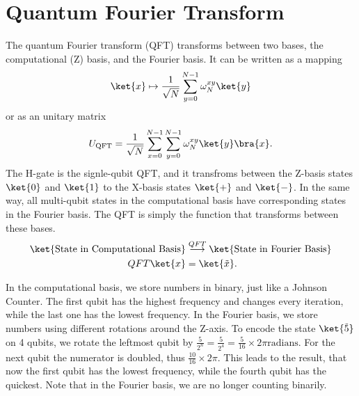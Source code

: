 \section{Quantum Fourier Transform}
The quantum Fourier transform (QFT) transforms between two bases, the
computational (Z) basis, and the Fourier basis. It can be written as a
mapping
\begin{equation}
  \label{eq:2}
  \ket{x} \mapsto \frac{1}{\sqrt{N}}\sum^{N-1}_{y=0}\omega^{xy}_{N}\ket{y}
\end{equation}
or as an unitary matrix
\begin{equation}
  \label{eq:3}
  U_{\text{QFT}}= \frac{1}{\sqrt{N}}\sum^{N-1}_{x=0}\sum^{N-1}_{y=0}\omega^{xy}_N\ket{y}\bra{x}.
\end{equation}
The H-gate is the
signle-qubit QFT, and it transfroms between the Z-basis states
$\ket{0}$ and $\ket{1}$ to the X-basis states $\ket{+}$ and
$\ket{-}$. In the same way, all multi-qubit states in the
computational basis have corresponding states in the Fourier
basis. The QFT is simply the function that transforms between these
bases.
\begin{align}
  \label{eq:1}
  \ket{\text{State in Computational Basis}}
  &\overset{QFT}{\longrightarrow} \ket{\text{State in Fourier
    Basis}}\\
  QFT\ket{x} &= \ket{\tilde{x}}.\\
\end{align}

In the computational basis, we store numbers in binary, just like a
Johnson Counter.
The first qubit has the highest frequency and changes every iteration,
while the last one has the lowest frequency.
In the Fourier basis, we store numbers using different rotations
around the Z-axis.
To encode the state $\ket{\tilde{5}}$ on 4 qubits, we rotate the
leftmost qubit by $\frac{5}{2^n} = \frac{5}{2^4} = \frac{5}{16}\times
2\pi \text{radians}$. For the next qubit the numerator is doubled,
thus $\frac{10}{16} \times 2\pi$.
This leads to the result, that now the first qubit has the lowest
frequency, while the fourth qubit has the quickest. Note that in the
Fourier basis, we are no longer counting binarily.
\begin{center}
\end{center}
